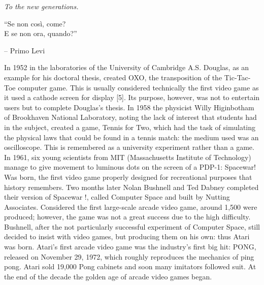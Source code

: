 \documentclass[12pt,british]{report}
\begin{document}
\renewcommand\contentsname{Index}
\frontespizio
\beforepreface

{
\raggedleft \large \sl To the new generations.\\
	
	\vspace{2cm}
	
	``Se non così, come?\\E se non ora, quando?''
	
	\bigskip
	
	\--- Primo Levi\\
}
         
% 
%

In 1952 in the laboratories of the University of Cambridge A.S. Douglas, as an example for his doctoral thesis, created OXO, the transposition of the Tic-Tac-Toe computer game. This is usually considered technically the first video game as it used a cathode screen for display [5]. Its purpose, however, was not to entertain users but to complete Douglas's thesis. In 1958 the physicist Willy Higinbotham of Brookhaven National Laboratory, noting the lack of interest that students had in the subject, created a game, Tennis for Two, which had the task of simulating the physical laws that could be found in a tennis match: the medium used was an oscilloscope. This is remembered as a university experiment rather than a game.
In 1961, six young scientists from MIT (Massachusetts Institute of Technology) manage to give movement to luminous dots on the screen of a PDP-1: Spacewar! Was born, the first video game properly designed for recreational purposes that history remembers.
Two months later Nolan Bushnell and Ted Dabney completed their version of Spacewar !, called Computer Space and built by Nutting Associates. Considered the first large-scale arcade video game, around 1,500 were produced; however, the game was not a great success due to the high difficulty.
Bushnell, after the not particularly successful experiment of Computer Space, still decided to insist with video games, but producing them on his own: thus Atari was born. Atari's first arcade video game was the industry's first big hit: PONG, released on November 29, 1972, which roughly reproduces the mechanics of ping pong. Atari sold 19,000 Pong cabinets and soon many imitators followed suit. At the end of the decade the golden age of arcade video games began.
\end{document}
